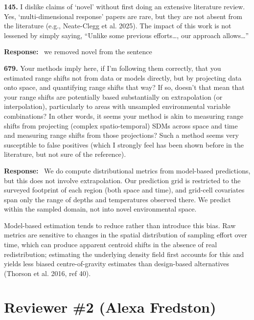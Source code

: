 \documentclass[11pt]{article}
\newcommand{\reviewer}[1]{\par\medskip\noindent\textcolor{revcolor}{#1}\par}
\newenvironment{reply}
{\par\smallskip\begingroup\color{replycolor}\noindent\textbf{Response:}\ }
{\endgroup\par\medskip}
\begin{document}
\reviewer{\textbf{145.} I dislike claims of `novel' without first doing an
extensive literature review. Yes, `multi-dimensional response' papers are rare, but
they are not absent from the literature (e.g., Neate-Clegg et al. 2025). The impact
of this work is not lessened by simply saying, ``Unlike some previous
efforts\ldots, our approach allows\ldots''}

\begin{reply}
we removed novel from the sentence
\end{reply}

\reviewer{\textbf{679.} Your methods imply here, if I'm following them correctly,
that you estimated range shifts not from data or models directly, but by projecting
data onto space, and quantifying range shifts that way? If so, doesn't that mean
that your range shifts are potentially based substantially on extrapolation (or
interpolation), particularly to areas with unsampled environmental variable
combinations? In other words, it seems your method is akin to measuring range
shifts from projecting (complex spatio-temporal) SDMs across space and time and
measuring range shifts from those projections? Such a method seems very
susceptible to false positives (which I strongly feel has been shown before in the
literature, but not sure of the reference).}

\begin{reply}
We do compute distributional metrics from model-based predictions, but this does not involve extrapolation. Our prediction grid is restricted to the surveyed footprint of each region (both space and time), and grid-cell covariates span only the range of depths and temperatures observed there. We predict within the sampled domain, not into novel environmental space.

Model-based estimation tends to reduce rather than introduce this bias. Raw metrics are sensitive to changes in the spatial distribution of sampling effort over time, which can produce apparent centroid shifts in the absence of real redistribution; estimating the underlying density field first accounts for this and yields less biased centre-of-gravity estimates than design-based alternatives (Thorson et al. 2016, ref 40).
\end{reply}

\section*{Reviewer \#2 (Alexa Fredston)}
\end{document}

